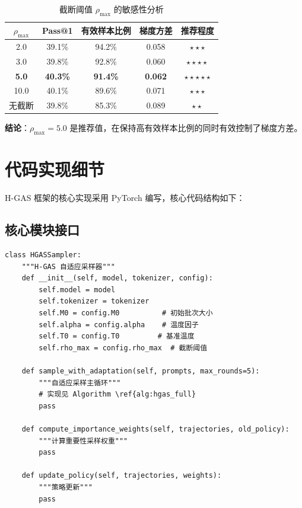 \begin{table}[htbp]
    \centering
    \caption{截断阈值 $\rho_{\max}$ 的敏感性分析}\label{tab:rho_sensitivity}
    \begin{tabular}{|c|c|c|c|c|}
    \hline
    \textbf{$\rho_{\max}$} & \textbf{Pass@1} & \textbf{有效样本比例} & \textbf{梯度方差} & \textbf{推荐程度} \\
    \hline
    2.0 & 39.1\% & 94.2\% & 0.058 & $\star\star\star$ \\
    3.0 & 39.8\% & 92.8\% & 0.060 & $\star\star\star\star$ \\
    \textbf{5.0} & \textbf{40.3\%} & \textbf{91.4\%} & \textbf{0.062} & $\star\star\star\star\star$ \\
    10.0 & 40.1\% & 89.6\% & 0.071 & $\star\star\star$ \\
    无截断 & 39.8\% & 85.3\% & 0.089 & $\star\star$ \\
    \hline
    \end{tabular}
\end{table}

\textbf{结论}：$\rho_{\max} = 5.0$ 是推荐值，在保持高有效样本比例的同时有效控制了梯度方差。

\section{代码实现细节}
\label{sec:appendix_code}

H-GAS 框架的核心实现采用 PyTorch 编写，核心代码结构如下：

\subsection{核心模块接口}

\begin{verbatim}
class HGASSampler:
    """H-GAS 自适应采样器"""
    def __init__(self, model, tokenizer, config):
        self.model = model
        self.tokenizer = tokenizer
        self.M0 = config.M0          # 初始批次大小
        self.alpha = config.alpha    # 温度因子
        self.T0 = config.T0         # 基准温度
        self.rho_max = config.rho_max  # 截断阈值

    def sample_with_adaptation(self, prompts, max_rounds=5):
        """自适应采样主循环"""
        # 实现见 Algorithm \ref{alg:hgas_full}
        pass

    def compute_importance_weights(self, trajectories, old_policy):
        """计算重要性采样权重"""
        pass

    def update_policy(self, trajectories, weights):
        """策略更新"""
        pass
\end{verbatim}

